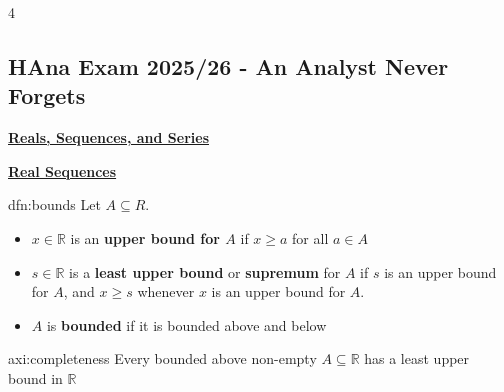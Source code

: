 \documentclass[landscape, 8pt]{extarticle}
\begin{document}
	
	\fontsize{5pt}{6pt} \selectfont
	
	\setlength\tabcolsep{4.5pt}
	\setlength\extrarowheight{2pt}
	
	\setlength{\abovedisplayskip}{0pt}
	\setlength{\belowdisplayskip}{0pt}
	\setlength{\abovedisplayshortskip}{0pt}
	\setlength{\belowdisplayshortskip}{0pt}
	\setlength\multicolsep{0pt}
	
	\begin{multicols*}{4}
		\raggedcolumns 
		\vspace*{-14pt}
		\subsection*{HAna Exam 2025/26 - An Analyst Never Forgets}
		\vspace{-5pt}
	
	
	
	
	
	{\footnotesize \textbf{\underline{Reals, Sequences, and Series}}}
	
	
	{\tiny \textbf{\underline{Real Sequences}}}
		
		
		
		\begin{dfn}{dfn:bounds}{ }
			Let $A \subseteq R$.
			\begin{itemize}[label=*]
				\item $x \in \mathbb{R}$ is an \textbf{upper bound for $A$} if $x \ge a$ for all $a \in A$
				\item $s \in \mathbb{R}$ is a \textbf{least upper bound} or \textbf{supremum} for $A$ if $s$ is an upper bound for $A$, and $x \ge s$ whenever $x$ is an upper bound for $A$.
				\item $A$ is \textbf{bounded} if it is bounded above and below
			\end{itemize}
			
		\end{dfn}
		
		\begin{axi}{axi:completeness}{ }
			Every bounded above non-empty $A \subseteq \mathbb{R}$ has a least upper bound in $\mathbb{R}$
			

\end{axi}
\end{multicols*}
\end{document}

